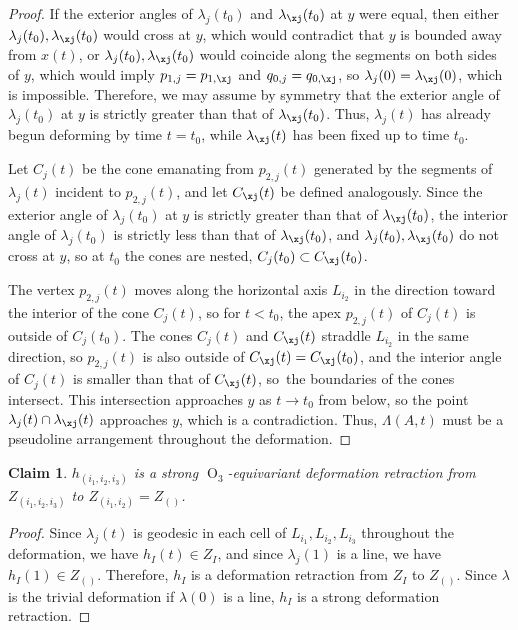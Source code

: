 \documentclass[JEP,XML,SOM,Unicode,NoFloatCountersInSection,published]{cedram}
\newtheorem{claim}[theorem]{Claim}
\theoremstyle{remark}
\DeclareMathOperator{\orth}{O}
\begin{document}
\begin{proof}
If the exterior angles of $\lambda_j(t_0)$ and $\lambda_\xj(t_0)$ at $y$ were equal, then either $\lambda_j(t_0),\lambda_\xj(t_0)$ would cross at $y$, which would contradict that $y$ is bounded away from $x(t)$, or $\lambda_j(t_0),\lambda_\xj(t_0)$ would coincide along the segments on both sides of $y$, which would imply $p_{1,j} = p_{1,\xj}$ and $q_{0,j} = q_{0,\xj}$, so $\lambda_j(0) = \lambda_\xj(0)$, which is impossible.
Therefore, we may assume by symmetry that the exterior angle of $\lambda_j(t_0)$ at $y$ is strictly greater than that of $\lambda_\xj(t_0)$. Thus, $\lambda_j(t)$ has already begun deforming by time $t=t_0$, while $\lambda_\xj(t)$ has been fixed up to time $t_0$.

Let $C_j(t)$ be the cone emanating from $p_{2,j}(t)$ generated by the segments of $\lambda_j(t)$ incident to $p_{2,j}(t)$, and let $C_\xj(t)$ be defined analogously.
Since the exterior angle of $\lambda_j(t_0)$ at $y$ is strictly greater than that of $\lambda_\xj(t_0)$, the interior angle of $\lambda_j(t_0)$ is strictly less than that of $\lambda_\xj(t_0)$, and $\lambda_j(t_0),\lambda_\xj(t_0)$ do not cross at $y$, so at $t_0$ the cones are nested, \ie $C_j(t_0) \subset C_\xj(t_0)$.

The vertex $p_{2,j}(t)$ moves along the horizontal axis $L_{i_2}$ in the direction toward the interior of the cone $C_j(t)$, so for $t < t_0$, the apex $p_{2,j}(t)$ of $C_j(t)$ is outside of $C_j(t_0)$. The cones $C_j(t)$ and $C_\xj(t)$ straddle $L_{i_2}$ in the same direction, so $p_{2,j}(t)$ is also outside of $C_\xj(t)= C_\xj(t_0)$, and the interior angle of $C_j(t)$ is smaller than that of $C_\xj(t)$, so~the boundaries of the cones intersect.
This intersection approaches $y$ as $t\to t_0$ from below, so the point $\lambda_j(t)\cap \lambda_\xj(t)$ approaches $y$, which is a contradiction.
Thus, $\Lambda(A,t)$ must be a pseudoline arrangement throughout the deformation.
\end{proof}

\begin{claim}\label{claim-deform-h3}
$h_{(i_1,i_2,i_3)}$ is a strong $\orth_3$-equivariant deformation retraction from $Z_{(i_1,i_2,i_3)}$ to $Z_{(i_1,i_2)} = Z_{()}$.
\end{claim}

\begin{proof}
Since $\lambda_j(t)$ is geodesic in each cell of $L_{i_1},L_{i_2},L_{i_3}$ throughout the deformation, we have $h_I(t) \in Z_I$, and since $\lambda_j(1)$ is a line, we have $h_I(1) \in Z_{()}$.
Therefore, $h_I$ is a deformation retraction from $Z_I$ to $Z_{()}$.
Since $\lambda$ is the trivial deformation if $\lambda(0)$ is a line, $h_I$ is a strong deformation retraction.
\end{proof}
\end{document}
